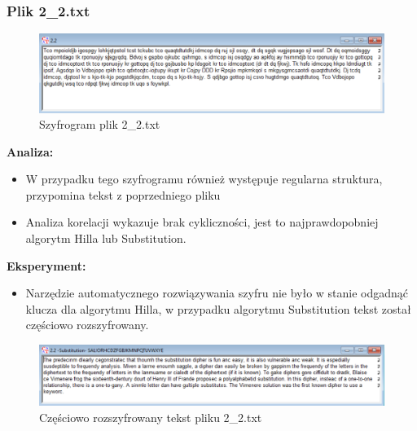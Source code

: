 \documentclass{article}
\begin{document}
\subsubsection*{Plik 2\_2.txt}
\begin{figure}[H]
    \centering
    \includegraphics[width=\textwidth]{2_2.png}
    \caption{Szyfrogram plik 2\_2.txt}
\end{figure}

\textbf{Analiza: }
\begin{itemize}
    \item W przypadku tego szyfrogramu również występuje regularna struktura, przypomina tekst z poprzedniego pliku
    \item Analiza korelacji wykazuje brak cykliczności, jest to najprawdopobniej algorytm Hilla lub Substitution.
\end{itemize}

\textbf{Eksperyment: }
\begin{itemize}
    \item Narzędzie automatycznego rozwiązywania szyfru nie było w stanie odgadnąć klucza dla algorytmu Hilla, w przypadku algorytmu Substitution tekst został
    częściowo rozszyfrowany.
\end{itemize}
\begin{figure}[H]
    \centering
    \includegraphics[width=\textwidth]{2_2_rozszyfrowany.png}
    \caption{Częściowo rozszyfrowany tekst pliku 2\_2.txt}
\end{figure}
\end{document}

